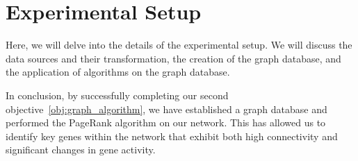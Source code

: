\section{Experimental Setup} \label{sec:experimental-setup}

Here, we will delve into the details of the experimental setup.
We will discuss the data sources and their transformation, the creation of the graph database,
and the application of algorithms on the graph database.










In conclusion, by successfully completing our second objective~\ref{obj:graph_algorithm},
we have established a graph database and performed the PageRank algorithm on our network.
This has allowed us to identify key genes within the network that exhibit both high connectivity
and significant changes in gene activity.
